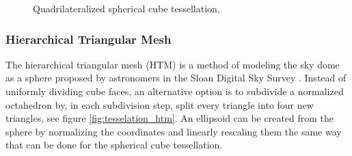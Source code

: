 \begin{figure}
\begin{subfigure}[b]{0.2\textwidth}
    \end{subfigure}
    \caption{Quadrilateralized spherical cube tessellation.}
    \label{fig:tesselation_cube}
\end{figure}

\subsubsection{Hierarchical Triangular Mesh}

The hierarchical triangular mesh (HTM) is a method of modeling the sky dome as a sphere proposed by astronomers in the Sloan Digital Sky Survey \cite{htm}. Instead of uniformly dividing cube faces, an alternative option is to subdivide a normalized octahedron by, in each subdivision step, split every triangle into four new triangles, see figure \ref{fig:tesselation_htm}. An ellipsoid can be created from the sphere by normalizing the coordinates and linearly rescaling them the same way that can be done for the spherical cube tessellation.

